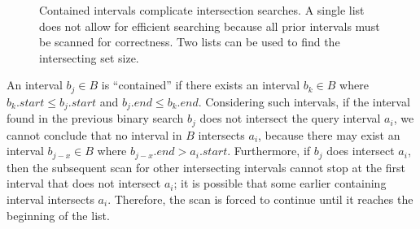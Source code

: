 \documentclass{bioinfo}
\begin{document}
	\begin{figure}[h]
		\centering
		\caption{Contained intervals complicate intersection searches.
		A single list  does not allow for
		efficient searching because all prior intervals must be scanned for
		correctness. Two lists  can be used to
		find the intersecting set size.}
		\label{bitssearching}
	\end{figure}

	An interval $b_j\in B$ is ``contained'' if there exists an interval
	$b_k \in B$ where $b_k.start \leq b_j.start$ and $b_j.end \leq
	b_k.end$.  Considering such intervals, if the interval found in the
	previous binary search $b_j$ does not intersect the query interval
	$a_i$, we cannot conclude that no interval in $B$ intersects $a_i$,
	because there may exist an interval $b_{j-x} \in B$ where $b_{j-x}.end
	> a_i.start$.  Furthermore, if $b_j$ does intersect $a_i$, then the
	subsequent scan for other intersecting intervals cannot stop at the
	first interval that does not intersect $a_i$; it is possible that some
	earlier containing interval intersects $a_i$. Therefore, the scan is
	forced to continue until it reaches the beginning of the list.
\end{document}
